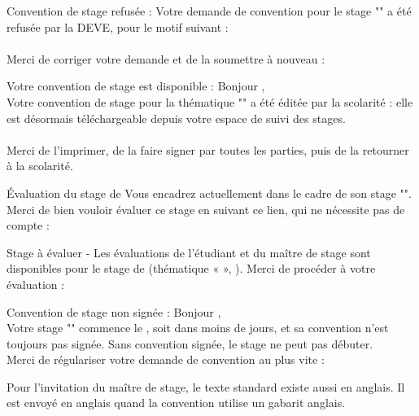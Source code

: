 \documentclass[11pt,a4paper]{article}
\begin{document}
\begin{courriel}{Convention de stage refusée : }
Votre demande de convention pour le stage "" a été refusée par la DEVE,
pour le motif suivant :\\[4pt]
\\[4pt]
Merci de corriger votre demande et de la soumettre à nouveau :\\
\end{courriel}

\begin{courriel}{Votre convention de stage est disponible : }
Bonjour ,\\[4pt]
Votre convention de stage pour la thématique "" a été éditée par la
scolarité : elle est désormais téléchargeable depuis votre espace de suivi des
stages.\\
\\[4pt]
Merci de l'imprimer, de la faire signer par toutes les parties, puis de la
retourner à la scolarité.
\end{courriel}

\begin{courriel}{Évaluation du stage de }
Vous encadrez actuellement  dans le cadre de son stage
"". Merci de bien vouloir évaluer ce stage en suivant ce lien, qui ne
nécessite pas de compte :\\
\end{courriel}

\begin{courriel}{Stage à évaluer - }
Les évaluations de l'étudiant et du maître de stage sont disponibles pour le
stage de  (thématique «  », ). Merci de
procéder à votre évaluation : 
\end{courriel}

\begin{courriel}{Convention de stage non signée : }
Bonjour ,\\[4pt]
Votre stage "" commence le , soit dans moins de
 jours, et sa convention n'est toujours pas signée. Sans convention
signée, le stage ne peut pas débuter.\\[4pt]
Merci de régulariser votre demande de convention au plus vite :\\
\end{courriel}

Pour l'invitation du maître de stage, le texte standard existe aussi en anglais.
Il est envoyé en anglais quand la convention utilise un gabarit anglais.
\end{document}
